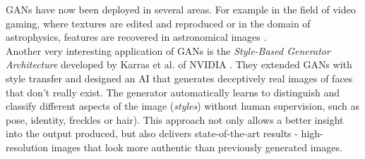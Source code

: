 GANs have now been deployed in several areas. For example in the field of video gaming, where textures are edited and reproduced \cite{resolutionGANWang2018Sep} or in the domain of astrophysics, features are recovered in astronomical images \cite{astroGANSchawinski2017Feb}.\\
Another very interesting application of GANs is the \textit{Style-Based Generator Architecture} developed by Karras et al. of NVIDIA \cite{nvidiaThisPersonDoesNotExistKarras2018Dec}. They extended GANs with style transfer and designed an AI that generates deceptively real images of faces that don't really exist. The generator automatically learns to distinguish and classify different aspects of the image (\textit{styles}) without human supervision, such as pose, identity, freckles or hair). This approach not only allows a better insight into the output produced, but also delivers state-of-the-art results - high-resolution images that look more authentic than previously generated images.

